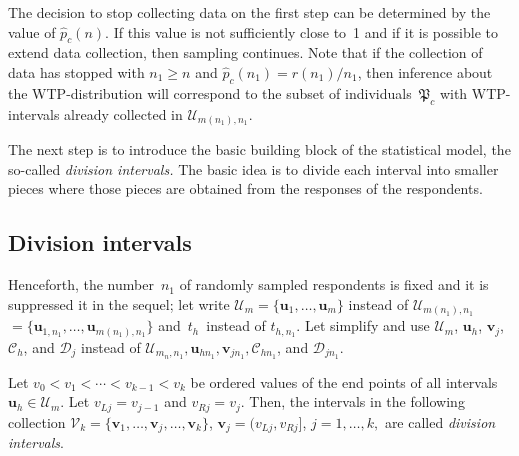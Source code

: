 \begin{multicols}{2}
\addtocounter{figure}{1}



The decision to stop  collecting data on the first step can be determined by the value of 
$\hat {p}_c(n).$ If this value is not sufficiently close to~1 and if it is
  possible to extend data collection, then sampling continues.  Note that if
  the collection of data  has stopped with $ n_1\ge n$ and 
  $\hat {p}_c(n_1)= r(n_1) /n_1$, then inference about the WTP-distribution
  will correspond to the subset of individuals~$\mathfrak{P}_c$ with
  WTP-intervals already collected in $\mathcal{U}_{m(n_1), n_1}.$

The next step is to introduce the basic building block of the statistical model,
the so-called \textit{division intervals.} The basic idea is to divide each 
interval into smaller pieces
where those pieces are obtained from the responses of the respondents.

\subsection{Division intervals}

\noindent
  Henceforth, the number~$n_1$ of randomly sampled respondents is fixed and 
  it is suppressed
  it in the sequel;  let write $\mathcal{U}_m =\{ \mathbf{u}_1, \ldots, {\mathbf
  u}_m \}$ instead of $\mathcal{U}_{m(n_1), n_1}$\linebreak
  $= \{ \mathbf{u}_{1, n_1}, \ldots, {\mathbf
  u}_{m(n_1), n_1} \}$ and~$t_h$~instead of $ t_{h, n_1}.$
Let simplify and use
 $ \mathcal{U}_m$, $\mathbf{u}_h$,  $\mathbf{v}_j$, $\mathcal{C}_h$,
  and $\mathcal{D}_j$ instead of
  $ \mathcal{U}_{m_{n}, n_1}, \mathbf{u}_{h n_1}, \mathbf{v}_{j n_1}, 
  \mathcal{C}_{h n_1}$, and $\mathcal{D}_{j n_1}.$

  Let $v_0 < v_1 < \cdots < v_{k-1} < v_k$ be ordered values of the end
  points of all intervals $\mathbf{u}_h\in\mathcal{U}_m.$
Let $v_{L j} = v_{j-1} $ and $  v_{Rj}=v_j.$
  Then, the intervals   in the following collection
  $ \mathcal{V}_k =\{ \mathbf{v}_1, \ldots, \mathbf{v}_j, \ldots , \mathbf{v}_k \}$, 
  $\mathbf{v}_j=(v_{Lj}, v_{Rj}]$,   
  $j=1, \ldots, k,$ are called \textit{division intervals}.


\end{multicols}
